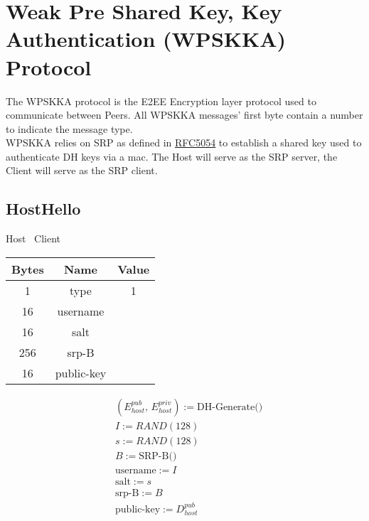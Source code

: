 \section{Weak Pre Shared Key, Key Authentication (WPSKKA) Protocol}

The WPSKKA protocol is the E2EE Encryption layer protocol used to communicate between Peers. All WPSKKA messages'
first byte contain a number to indicate
the message type.\\

WPSKKA relies on SRP as defined in \href{https://datatracker.ietf.org/doc/html/rfc5054}{RFC5054} to establish a
shared key used to authenticate DH keys via a mac. The Host will serve as the SRP server, the Client will serve as the SRP
client.\\

\subsection{HostHello}

\begin{center}
    Host \textrightarrow\ Client\\
    \begin{tabular}{|c|c|c|}
        \hline
        \textbf{Bytes} & \textbf{Name} & \textbf{Value} \\
        \hline
        1              & type          & 1              \\
        \hline
        16             & username      &                \\
        \hline
        16             & salt          &                \\
        \hline
        256            & srp-B         &                \\
        \hline
        16             & public-key    &                \\
        \hline
    \end{tabular}
\end{center}

\begin{align*}
    & (E_{host}^{pub},\, E_{host}^{priv}) := \text{DH-Generate()}\\
    & I := RAND(128)\\
    & s := RAND(128)\\
    & B := \text{SRP-B()}\\
    & \text{username} := I\\
    & \text{salt} := s\\
    & \text{srp-B} := B\\
    & \text{public-key} := D_{host}^{pub}\\
\end{align*}


